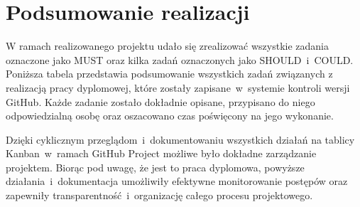     \section{Podsumowanie realizacji}
    \label{sec:podsumowanie realizacji}
    W ramach realizowanego projektu udało się zrealizować wszystkie zadania oznaczone jako MUST oraz kilka zadań oznaczonych jako SHOULD~i~COULD. 
    Poniższa tabela przedstawia podsumowanie wszystkich zadań związanych z realizacją pracy dyplomowej, które zostały zapisane~w~systemie kontroli wersji GitHub. 
    Każde zadanie zostało dokładnie opisane, przypisano do niego odpowiedzialną osobę oraz oszacowano czas poświęcony na jego wykonanie.

    Dzięki cyklicznym przeglądom~i~dokumentowaniu wszystkich działań na tablicy Kanban~w~ramach GitHub Project możliwe było 
    dokładne zarządzanie projektem. Biorąc pod uwagę, że jest to praca dyplomowa, powyższe działania~i~dokumentacja umożliwiły efektywne monitorowanie postępów oraz zapewniły 
    transparentność~i~organizację całego procesu projektowego.

